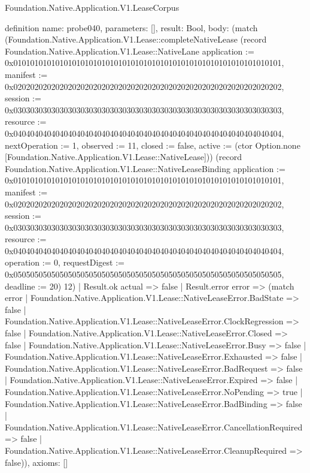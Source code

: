 \begin{lexlean}{Foundation.Native.Application.V1.LeaseCorpus}
\begin{semanticmodule}
definition{
  name: probe040,
  parameters: [],
  result: Bool,
  body: (match (Foundation.Native.Application.V1.Lease::completeNativeLease (record Foundation.Native.Application.V1.Lease::NativeLane {application := 0x0101010101010101010101010101010101010101010101010101010101010101, manifest := 0x0202020202020202020202020202020202020202020202020202020202020202, session := 0x0303030303030303030303030303030303030303030303030303030303030303, resource := 0x0404040404040404040404040404040404040404040404040404040404040404, nextOperation := 1, observed := 11, closed := false, active := (ctor Option.none [Foundation.Native.Application.V1.Lease::NativeLease])}) (record Foundation.Native.Application.V1.Lease::NativeLeaseBinding {application := 0x0101010101010101010101010101010101010101010101010101010101010101, manifest := 0x0202020202020202020202020202020202020202020202020202020202020202, session := 0x0303030303030303030303030303030303030303030303030303030303030303, resource := 0x0404040404040404040404040404040404040404040404040404040404040404, operation := 0, requestDigest := 0x0505050505050505050505050505050505050505050505050505050505050505, deadline := 20}) 12)
    | Result.ok actual => false
    | Result.error error => (match error
      | Foundation.Native.Application.V1.Lease::NativeLeaseError.BadState => false
      | Foundation.Native.Application.V1.Lease::NativeLeaseError.ClockRegression => false
      | Foundation.Native.Application.V1.Lease::NativeLeaseError.Closed => false
      | Foundation.Native.Application.V1.Lease::NativeLeaseError.Busy => false
      | Foundation.Native.Application.V1.Lease::NativeLeaseError.Exhausted => false
      | Foundation.Native.Application.V1.Lease::NativeLeaseError.BadRequest => false
      | Foundation.Native.Application.V1.Lease::NativeLeaseError.Expired => false
      | Foundation.Native.Application.V1.Lease::NativeLeaseError.NoPending => true
      | Foundation.Native.Application.V1.Lease::NativeLeaseError.BadBinding => false
      | Foundation.Native.Application.V1.Lease::NativeLeaseError.CancellationRequired => false
      | Foundation.Native.Application.V1.Lease::NativeLeaseError.CleanupRequired => false)),
  axioms: []
}


\end{semanticmodule}
\end{lexlean}
